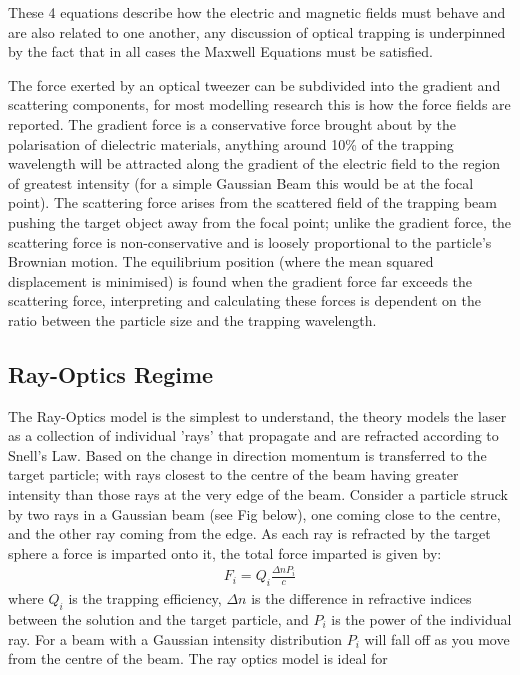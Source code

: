 These 4 equations describe how the electric and magnetic fields must behave and are also related to one another, any discussion of optical trapping is underpinned by the fact that in all cases the Maxwell Equations must be satisfied. 

The force exerted by an optical tweezer can be subdivided into the gradient and scattering components, for most modelling research this is how the force fields are reported. The gradient force is a conservative force brought about by the polarisation of dielectric materials, anything around 10\% of the trapping wavelength will be attracted along the gradient of the electric field to the region of greatest intensity (for a simple Gaussian Beam this would be at the focal point). The scattering force arises from the scattered field of the trapping beam pushing the target object away from the focal point; unlike the gradient force, the scattering force is non-conservative and is loosely proportional to the particle's Brownian motion. The equilibrium position (where the mean squared displacement is minimised) is found when the gradient force far exceeds the scattering force, interpreting and calculating these forces is dependent on the ratio between the particle size and the trapping wavelength.


\subsection{Ray-Optics Regime}

The Ray-Optics model is the simplest to understand, the theory models the laser as a collection of individual 'rays' that propagate and are refracted according to Snell's Law. Based on the change in direction momentum is transferred to the target particle; with rays closest to the centre of the beam having greater intensity than those rays at the very edge of the beam. Consider a particle struck by two rays in a Gaussian beam (see Fig below), one coming close to the centre, and the other ray coming from the edge. As each ray is refracted by the target sphere a force is imparted onto it, the total force imparted is given by:
\begin{align}
	F_i = Q_i\frac{\Delta n P_i}{c}
\end{align}
where $Q_i$ is the trapping efficiency, $\Delta n$ is the difference
in refractive indices between the solution and the target particle,
and $P_i$ is the power of the individual ray. For a beam with a
Gaussian intensity distribution $P_i$ will fall off as you move from
the centre of the beam.  The ray optics model is ideal for


